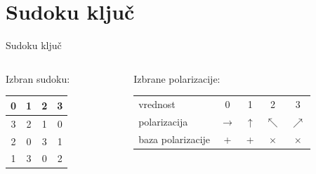 \documentclass{beamer}
\begin{document}

\section{Sudoku ključ}


\begin{frame}{Sudoku ključ}

\begin{columns}

\begin{column}{0.3\textwidth}

Izbran sudoku:\\

\begin{center}
\begin{tabular}{| c | c || c | c |}
\hline
0 & 1 & 2 & 3\\
\hline
3 & 2 & 1 & 0\\
\hline
\hline
2 & 0 & 3 & 1\\
\hline
1 & 3 & 0 & 2\\
\hline
\end{tabular}
\end{center}

\end{column}


\begin{column}{0.7\textwidth}

Izbrane polarizacije: \bigskip

\begin{tabular}{l c c c c}
vrednost & 0 & 1 & 2 & 3\\
polarizacija & $\rightarrow$ & $\uparrow$ & $\nwarrow$ & $\nearrow$\\
baza polarizacije & + & + & $\times$ & $\times$\\
\end{tabular}

\end{column}

\end{columns}

\bigskip


\end{frame}
\end{document}
